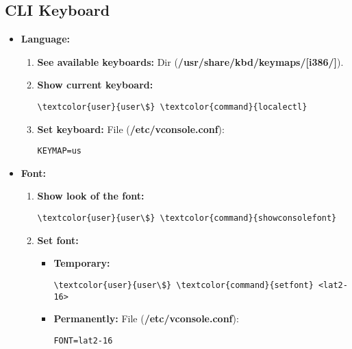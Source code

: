 \documentclass[10pt, a4paper, onecolumn, openany]{book} %
\begin{document}
\subsection{CLI Keyboard}
\begin{itemize}
    \item \textbf{Language:}
    \begin{enumerate}
        \item \textbf{See available keyboards:}
\newline Dir (\textbf{\textcolor{dir}{/usr/share/kbd/keymaps/[i386/]}}).
        \item \textbf{Show current keyboard:}
\begin{Verbatim}[commandchars=\\\{\}]
\textcolor{user}{user\$} \textcolor{command}{localectl}
\end{Verbatim}                
        
        \item \textbf{Set keyboard:}
\newline File (\textbf{\textcolor{file}{/etc/vconsole.conf}}):
\begin{Verbatim}[commandchars=\\\{\}]
KEYMAP=us
\end{Verbatim}    
    \end{enumerate}
    
    \item \textbf{Font:}
    \begin{enumerate}
        \item \textbf{Show look of the font:}
\begin{Verbatim}[commandchars=\\\{\}]
\textcolor{user}{user\$} \textcolor{command}{showconsolefont}
\end{Verbatim}  
        \item \textbf{Set font:}
        \begin{itemize}
            \item \textbf{Temporary:}
\begin{Verbatim}[commandchars=\\\{\}]
\textcolor{user}{user\$} \textcolor{command}{setfont} <lat2-16>
\end{Verbatim}                
            \item \textbf{Permanently:}
\newline File (\textbf{\textcolor{file}{/etc/vconsole.conf}}):
\begin{Verbatim}[commandchars=\\\{\}]
FONT=lat2-16
\end{Verbatim}    
        \end{itemize}
    \end{enumerate}
\end{itemize}
\end{document}
